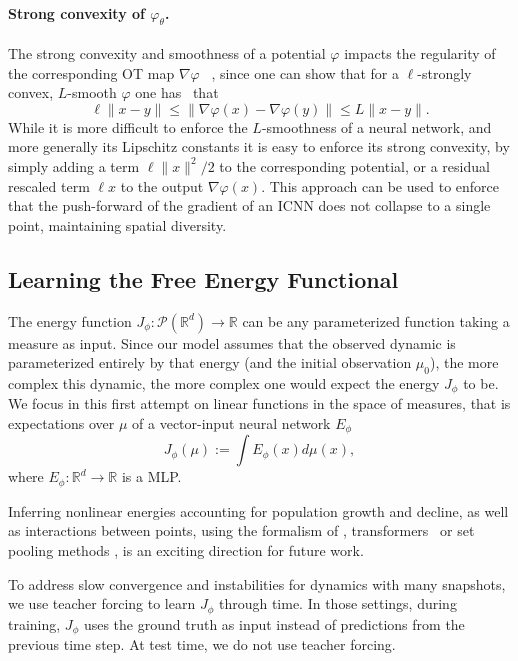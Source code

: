 \paragraph{Strong convexity of $\varphi_\theta$.} The strong convexity and smoothness of a potential $\varphi$ impacts the regularity of the corresponding OT map $\nabla\varphi$ ~\citep{caffarelli2000monotonicity,figalli2010optimal}, since one can show that for a $\ell$-strongly convex, $L$-smooth $\varphi$ one has~\citep{paty2020regularity} that
$$
\ell \|x - y\| \leq \|\nabla\varphi(x) -\nabla\varphi(y)\|  \leq L\|x - y\|.
$$
While it is more difficult to enforce the $L$-smoothness of a neural network, and more generally its Lipschitz constants \citep{scaman2018lipschitz} it is easy to enforce its strong convexity, by simply adding a term $\ell \|x\|^2/2$ to the corresponding potential, or a residual rescaled term $\ell x$ to the output $\nabla\varphi(x)$. This approach can be used to enforce that the push-forward of the gradient of an \acrshort{ICNN} does not collapse to a single point, maintaining spatial diversity.

\subsection{Learning the Free Energy Functional}  \label{sec:learn_energy}
The energy function $J_\phi : \mathcal{P}(\mathbb{R}^d) \rightarrow \mathbb{R}$ can be any parameterized function taking a measure as input. 
Since our model assumes that the observed dynamic is parameterized entirely by that energy (and the initial observation $\mu_0$), the more complex this dynamic, the more complex one would expect the energy $J_\phi$ to be. We focus in this first attempt on linear functions in the space of measures, that is expectations over $\mu$ of a vector-input neural network $E_\phi$
\begin{equation} \label{eq:energy}
    J_\phi(\mu) := \int E_\phi(x) d\mu(x),
\end{equation}
where $E_\phi:\mathbb{R}^d \rightarrow \mathbb{R}$ is a \acrfull{MLP}.


Inferring nonlinear energies accounting for population growth and decline, as well as interactions between points, using the formalism of \citep{de2019stochastic}, transformers~\citep{vaswani2017attention} or set pooling methods \citep{edwards2016towards, zaheer2017deep}, is an exciting direction for future work.

To address slow convergence and instabilities for dynamics with many snapshots, we use teacher forcing \citep{williams1989learning} to learn $J_\phi$ through time. In those settings, during training, $J_\phi$ uses the ground truth as input instead of predictions from the previous time step. At test time, we do not use teacher forcing.

